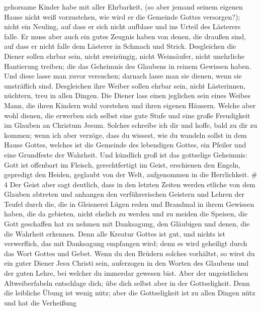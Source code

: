 gehorsame Kinder habe mit aller Ehrbarkeit,  (so aber jemand
seinem eigenen Hause nicht weiß vorzustehen, wie wird er die Gemeinde
Gottes versorgen?);  nicht ein Neuling, auf dass er sich
nicht aufblase und ins Urteil des Lästerers falle.  Er muss
aber auch ein gutes Zeugnis haben von denen, die draußen sind, auf dass
er nicht falle dem Lästerer in Schmach und Strick. 
Desgleichen die Diener sollen ehrbar sein, nicht zweizüngig, nicht
Weinsäufer, nicht unehrliche Hantierung treiben;  die das
Geheimnis des Glaubens in reinem Gewissen haben.  Und diese
lasse man zuvor versuchen; darnach lasse man sie dienen, wenn sie
unsträflich sind.  Desgleichen ihre Weiber sollen ehrbar
sein, nicht Lästerinnen, nüchtern, treu in allen Dingen. 
Die Diener lass einen jeglichen sein eines Weibes Mann, die ihren
Kindern wohl vorstehen und ihren eigenen Häusern.  Welche
aber wohl dienen, die erwerben sich selbst eine gute Stufe und eine
große Freudigkeit im Glauben an Christum Jesum.  Solches
schreibe ich dir und hoffe, bald zu dir zu kommen;  wenn
ich aber verzöge, dass du wissest, wie du wandeln sollst in dem Hause
Gottes, welches ist die Gemeinde des lebendigen Gottes, ein Pfeiler und
eine Grundfeste der Wahrheit.  Und kündlich groß ist das
gottselige Geheimnis: Gott ist offenbart im Fleisch, gerechtfertigt im
Geist, erschienen den Engeln, gepredigt den Heiden, geglaubt von der
Welt, aufgenommen in die Herrlichkeit. \# 4  Der Geist aber
sagt deutlich, dass in den letzten Zeiten werden etliche von dem Glauben
abtreten und anhangen den verführerischen Geistern und Lehren der Teufel
 durch die, die in Gleisnerei Lügen reden und Brandmal in
ihrem Gewissen haben,  die da gebieten, nicht ehelich zu
werden und zu meiden die Speisen, die Gott geschaffen hat zu nehmen mit
Danksagung, den Gläubigen und denen, die die Wahrheit erkennen.
 Denn alle Kreatur Gottes ist gut, und nichts ist
verwerflich, das mit Danksagung empfangen wird;  denn es
wird geheiligt durch das Wort Gottes und Gebet.  Wenn du den
Brüdern solches vorhältst, so wirst du ein guter Diener Jesu Christi
sein, auferzogen in den Worten des Glaubens und der guten Lehre, bei
welcher du immerdar gewesen bist.  Aber der ungeistlichen
Altweiberfabeln entschlage dich; übe dich selbst aber in der
Gottseligkeit.  Denn die leibliche Übung ist wenig nütz;
aber die Gottseligkeit ist zu allen Dingen nütz und hat die Verheißung
